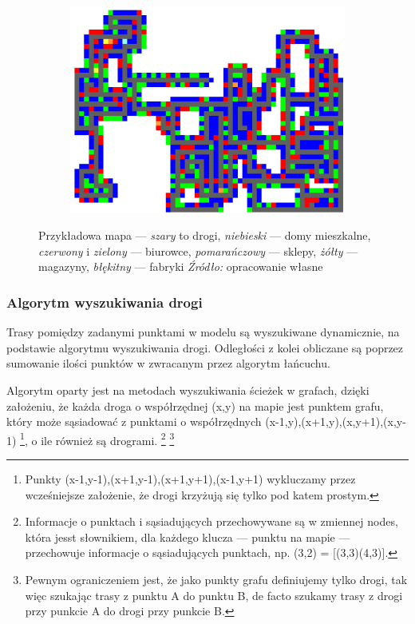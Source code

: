 \documentclass[polish, twoside, 12pt, a4paper]{article}
\theoremstyle{definition}
\theoremstyle{plain}
\theoremstyle{remark}
\begin{document}
\begin{figure}[hbt]
  \centering
  \begin{subfigure}[t]{0.45\textwidth}
    \includegraphics[width=\textwidth]{pictures/mapatypow.png}
  \end{subfigure}
  \captionsetup{margin=10pt,font=small,labelfont=bf,width=.8\textwidth}
  \caption[Przykładowa wygenerowana mapa]{Przykładowa mapa --- \textit{szary} to drogi, \textit{niebieski} --- domy mieszkalne, \textit{czerwony} i \textit{zielony} --- biurowce, \textit{pomarańczowy} --- sklepy, \textit{żółty} --- magazyny, \textit{błękitny} --- fabryki \textit{Źródło:} opracowanie własne}\label{fig:mapa}
\end{figure}


\subsubsection{Algorytm wyszukiwania drogi} 

Trasy pomiędzy zadanymi punktami w modelu są wyszukiwane dynamicznie, na podstawie algorytmu wyszukiwania drogi. Odległości z kolei obliczane są poprzez sumowanie ilości punktów w zwracanym przez algorytm łańcuchu. 

Algorytm oparty jest na metodach wyszukiwania ścieżek w grafach, dzięki założeniu, że każda droga o współrzędnej (x,y) na mapie jest punktem grafu, który może sąsiadować z punktami o współrzędnych (x-1,y),(x+1,y),(x,y+1),(x,y-1) \footnote{Punkty (x-1,y-1),(x+1,y-1),(x+1,y+1),(x-1,y+1) wykluczamy przez wcześniejsze założenie, że drogi krzyżują się tylko pod katem prostym.}, o ile również są drogrami. \footnote{Informacje o punktach i sąsiadujących przechowywane są w zmiennej nodes, która jesst słownikiem, dla każdego klucza --- punktu na mapie --- przechowuje informacje o sąsiadujących punktach, np. (3,2) = [(3,3)(4,3)].} \footnote{Pewnym ograniczeniem jest, że jako punkty grafu definiujemy tylko drogi, tak więc szukając trasy z punktu A do punktu B, de facto szukamy trasy z drogi przy punkcie A do drogi przy punkcie B.}
\end{document}
